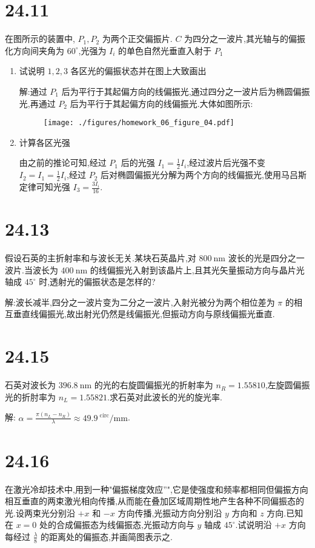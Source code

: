     \section{24.11} 在图所示的装置中, $P_1,P_2$ 为两个正交偏振片. $C$ 为四分之一波片,其光轴与的偏振化方向间夹角为 $60^{\circ}$,光强为 $I_{i}$ 的单色自然光垂直入射于 $P_1$
    \begin{enumerate}
        \item 试说明 $1,2,3$ 各区光的偏振状态并在图上大致画出

            解:通过 $P_1$ 后为平行于其起偏方向的线偏振光,通过四分之一波片后为椭圆偏振光,再通过 $P_2$ 后为平行于其起偏方向的线偏振光.大体如图所示:
            \begin{figure}[htbp]
                \centering
                \texttt{[image: ./figures/homework\_06\_figure\_04.pdf]}
            \end{figure}
        \item 计算各区光强

            由之前的推论可知,经过 $P_1$ 后的光强 $I_1=\frac{1}{2}I_{i}$,经过波片后光强不变 $I_2=I_1=\frac{1}{2}I_{i}$,经过 $P_2$ 后对椭圆偏振光分解为两个方向的线偏振光,使用马吕斯定律可知光强 $I_3=\frac{3I_{i}}{16}$.
    \end{enumerate}
    \section{24.13} 假设石英的主折射率和与波长无关.某块石英晶片,对 $800 \ \mathrm{nm}$ 波长的光是四分之一波片.当波长为 $400 \ \mathrm{nm}$ 的线偏振光入射到该晶片上,且其光矢量振动方向与晶片光轴成 $45^{\circ}$ 时,透射光的偏振状态是怎样的?

    解:波长减半,四分之一波片变为二分之一波片,入射光被分为两个相位差为 $\pi$ 的相互垂直线偏振光,故出射光仍然是线偏振光,但振动方向与原线偏振光垂直.
    \section{24.15} 石英对波长为 $396.8 \ \mathrm{nm}$ 的光的右旋圆偏振光的折射率为 $n_{R}=1.55810$,左旋圆偏振光的折肘率为 $n_{L}=1.55821$.求石英对此波长的光的旋光率.

    解: $\alpha=\frac{\pi\left( n_{L}-n_{R} \right) }{\lambda}\approx 49.9 \ \mathrm{^{circ}/mm}$.
    \section{24.16} 在激光冷却技术中,用到一种"偏振梯度效应”",它是使强度和频率都相同但偏振方向相互垂直的两束激光相向传播,从而能在叠加区域周期性地产生各种不同偏振态的光.设两束光分别沿 $+x$ 和 $-x$ 方向传播,光振动方向分别沿 $y$ 方向和 $z$ 方向.已知在 $x=0$ 处的合成偏振态为线偏振态,光振动方向与 $y$ 轴成 $45^{\circ}$.试说明沿 $+x$ 方向每经过 $\frac{\lambda}{8}$ 的距离处的偏振态,并画简图表示之.

